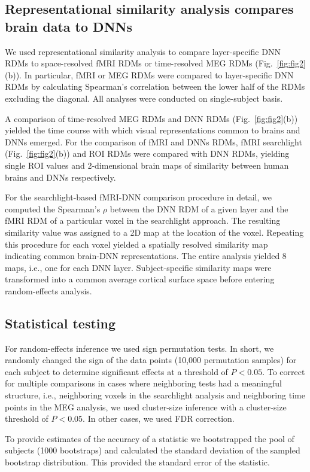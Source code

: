 \documentclass[10pt,twocolumn,letterpaper]{article}
\begin{document}
\subsection{Representational similarity analysis compares brain data to DNNs}
We used representational similarity analysis to compare layer-specific DNN RDMs to space-resolved fMRI RDMs or time-resolved MEG RDMs (Fig.~\ref{fig:fig2}(b)). In particular, fMRI or MEG RDMs were compared to layer-specific DNN RDMs by calculating Spearman's correlation between the lower half of the RDMs excluding the diagonal. All analyses were conducted on single-subject basis. 

A comparison of time-resolved MEG RDMs and DNN RDMs (Fig.~\ref{fig:fig2}(b)) yielded the time course with which visual representations common to brains and DNNs emerged. For the comparison of fMRI and DNNs RDMs, fMRI searchlight (Fig.~\ref{fig:fig2}(b)) and ROI RDMs were compared with DNN RDMs, yielding single ROI values and 2-dimensional brain maps of similarity between human brains and DNNs respectively. 

For the searchlight-based fMRI-DNN comparison procedure in detail, we computed the Spearman's $\rho$ between the DNN RDM of a given layer and the fMRI RDM of a particular voxel in the searchlight approach. The resulting similarity value was assigned to a 2D map at the location of the voxel. Repeating this procedure for each voxel yielded a spatially resolved similarity map indicating common brain-DNN representations. The entire analysis yielded 8 maps, i.e., one for each DNN layer. Subject-specific similarity maps were transformed into a common average cortical surface space before entering random-effects analysis.

\subsection{Statistical testing}
For random-effects inference we used sign permutation tests. In short, we randomly changed the sign of the data points (10,000 permutation samples) for each subject to determine significant effects at a threshold of $P < 0.05$. To correct for multiple comparisons in cases where neighboring tests had a meaningful structure, i.e., neighboring voxels in the searchlight analysis and neighboring time points in the MEG analysis, we used cluster-size inference with a cluster-size threshold of $P < 0.05$. In other cases, we used FDR correction.

To provide estimates of the accuracy of a statistic we bootstrapped the pool of subjects (1000 bootstraps) and calculated the standard deviation of the sampled bootstrap distribution. This provided the standard error of the statistic.
 
\end{document}

